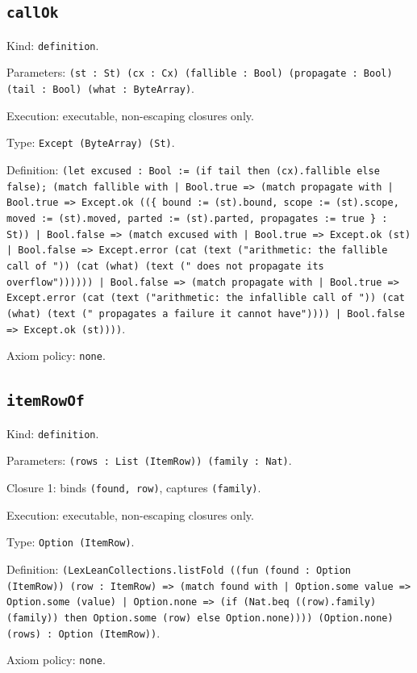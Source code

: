 \documentclass[11pt]{article}
\begin{document}
\subsection*{\texttt{callOk}}
\noindent Kind: \texttt{definition}.\par
\noindent Parameters: \texttt{(st : St) (cx : Cx) (fallible : Bool) (propagate : Bool) (tail : Bool) (what : ByteArray)}.\par
\noindent Execution: executable, non-escaping closures only.\par
\noindent Type: \texttt{Except (ByteArray) (St)}.\par
\noindent Definition: \texttt{(let excused : Bool := (if tail then (cx).fallible else false); (match fallible with | Bool.true => (match propagate with | Bool.true => Except.ok ((\{ bound := (st).bound, scope := (st).scope, moved := (st).moved, parted := (st).parted, propagates := true \} : St)) | Bool.false => (match excused with | Bool.true => Except.ok (st) | Bool.false => Except.error (cat (text ("arithmetic: the fallible call of ")) (cat (what) (text (" does not propagate its overflow")))))) | Bool.false => (match propagate with | Bool.true => Except.error (cat (text ("arithmetic: the infallible call of ")) (cat (what) (text (" propagates a failure it cannot have")))) | Bool.false => Except.ok (st))))}.\par
\noindent Axiom policy: \texttt{none}.\par
\subsection*{\texttt{itemRowOf}}
\noindent Kind: \texttt{definition}.\par
\noindent Parameters: \texttt{(rows : List (ItemRow)) (family : Nat)}.\par
\noindent Closure 1: binds \texttt{(found, row)}, captures \texttt{(family)}.\par
\noindent Execution: executable, non-escaping closures only.\par
\noindent Type: \texttt{Option (ItemRow)}.\par
\noindent Definition: \texttt{(LexLeanCollections.listFold ((fun (found : Option (ItemRow)) (row : ItemRow) => (match found with | Option.some value => Option.some (value) | Option.none => (if (Nat.beq ((row).family) (family)) then Option.some (row) else Option.none)))) (Option.none) (rows) : Option (ItemRow))}.\par
\noindent Axiom policy: \texttt{none}.\par
\end{document}
